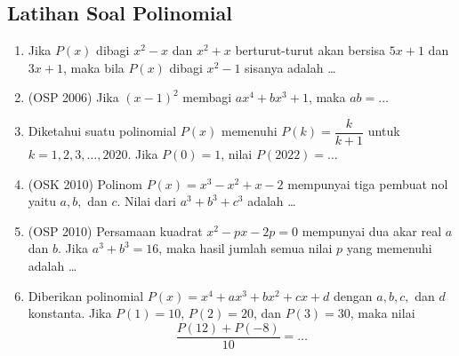 \subsection{Latihan Soal Polinomial}
\begin{enumerate}

\item Jika $P(x)$ dibagi $x^2-x$ dan $x^2+x$ berturut-turut akan bersisa $5x+1$ dan $3x+1$, maka bila $P(x)$ dibagi $x^2-1$ sisanya adalah \dots

\item (OSP 2006) Jika $(x-1)^2$ membagi $ax^4+bx^3+1$, maka $ab=\dots$

\item Diketahui suatu polinomial $P(x)$ memenuhi $P(k)=\dfrac{k}{k+1}$ untuk $k=1,2,3,\dots,2020$. Jika $P(0)=1$, nilai $P(2022)=\dots$

\item (OSK 2010) Polinom $P(x)=x^3-x^2+x-2$ mempunyai tiga pembuat nol yaitu $a,b,$ dan $c$. Nilai dari $a^3+b^3+c^3$ adalah \dots

\item (OSP 2010) Persamaan kuadrat $x^2-px-2p=0$ mempunyai dua akar real $a$ dan $b$. Jika $a^3+b^3=16$, maka hasil jumlah semua nilai $p$ yang memenuhi adalah \dots 

\item Diberikan polinomial $P(x)=x^4+ax^3+bx^2+cx+d$ dengan $a,b,c,$ dan $d$ konstanta. Jika $P(1)=10$, $P(2)=20$, dan  $P(3)=30$, maka nilai
$$\dfrac{P(12)+P(-8)}{10}=\dots$$
\end{enumerate}